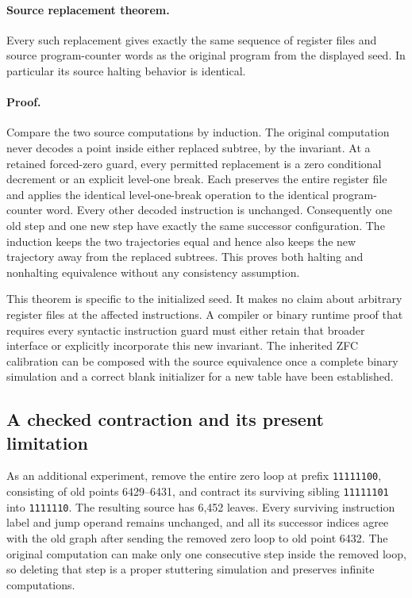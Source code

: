 \paragraph{Source replacement theorem.}
Every such replacement gives exactly the same sequence of register files and
source program-counter words as the original program from the displayed seed.
In particular its source halting behavior is identical.

\paragraph{Proof.}
Compare the two source computations by induction.  The original computation
never decodes a point inside either replaced subtree, by the invariant.  At a
retained forced-zero guard, every permitted replacement is a zero conditional
decrement or an explicit level-one break.  Each preserves the entire register
file and applies the identical level-one-break operation to the identical
program-counter word.  Every other decoded instruction is unchanged.
Consequently one old step and one new step have exactly the same successor
configuration.  The induction keeps the two trajectories equal and hence also
keeps the new trajectory away from the replaced subtrees.  This proves both
halting and nonhalting equivalence without any consistency assumption.

This theorem is specific to the initialized seed.  It makes no claim about
arbitrary register files at the affected instructions.  A compiler or binary
runtime proof that requires every syntactic instruction guard must either
retain that broader interface or explicitly incorporate this new invariant.
The inherited ZFC calibration can be composed with the source equivalence
once a complete binary simulation and a correct blank initializer for a new
table have been established.

\subsection{A checked contraction and its present limitation}

As an additional experiment, remove the entire zero loop at prefix
\texttt{11111100}, consisting of old points 6429--6431, and contract its
surviving sibling \texttt{11111101} into \texttt{1111110}.  The resulting source
has 6,452 leaves.  Every surviving instruction label and jump operand remains
unchanged, and all its successor indices agree with the old graph after
sending the removed zero loop to old point 6432.  The original computation
can make only one consecutive step inside the removed loop, so deleting that
step is a proper stuttering simulation and preserves infinite computations.

